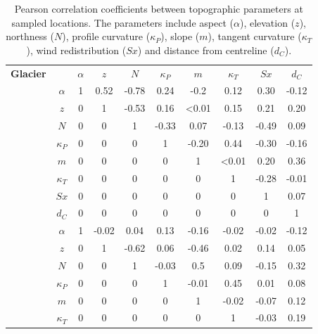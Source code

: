 \documentclass[12pt]{article}
\begin{document}
\begin{table}[]
\centering
\caption{Pearson correlation coefficients between topographic parameters at sampled locations. The parameters include aspect ($\alpha$), elevation ($z$), northness ($N$), profile curvature ($\kappa_P$), slope ($m$), tangent curvature ($\kappa_T$), wind redistribution ($Sx$) and distance from centreline ($d_C$).}
\label{tab:pearson_correlation}
\begin{tabular}{cccccccccc}
\textbf{Glacier} &  & \textbf{$\alpha$} & \textbf{$z$} & \textbf{$N$} & \textbf{$\kappa_P$} & \textbf{$m$} & \textbf{$\kappa_T$} & \textbf{$Sx$} & \textbf{$d_C$} \\
\rowcolor[HTML]{EFEFEF} 
\cellcolor[HTML]{EFEFEF} & \textbf{$\alpha$} & 1 & 0.52 & -0.78 & 0.24 & -0.2 & 0.12 & 0.30 & -0.12 \\
\rowcolor[HTML]{EFEFEF} 
\cellcolor[HTML]{EFEFEF} & \textbf{$z$} & 0 & 1 & -0.53 & 0.16 & \textless 0.01 & 0.15 & 0.21 & 0.20 \\
\rowcolor[HTML]{EFEFEF} 
\cellcolor[HTML]{EFEFEF} & \textbf{$N$} & 0 & 0 & 1 & -0.33 & 0.07 & -0.13 & -0.49 & 0.09 \\
\rowcolor[HTML]{EFEFEF} 
\cellcolor[HTML]{EFEFEF} & \textbf{$\kappa_P$} & 0 & 0 & 0 & 1 & -0.20 & 0.44 & -0.30 & -0.16 \\
\rowcolor[HTML]{EFEFEF} 
\cellcolor[HTML]{EFEFEF} & \textbf{$m$} & 0 & 0 & 0 & 0 & 1 & \textless 0.01 & 0.20 & 0.36 \\
\rowcolor[HTML]{EFEFEF} 
\cellcolor[HTML]{EFEFEF} & \textbf{$\kappa_T$} & 0 & 0 & 0 & 0 & 0 & 1 & -0.28 & -0.01 \\
\rowcolor[HTML]{EFEFEF} 
\cellcolor[HTML]{EFEFEF} & \textbf{$Sx$} & 0 & 0 & 0 & 0 & 0 & 0 & 1 & 0.07 \\
\rowcolor[HTML]{EFEFEF} 
\multirow{-8}{*}{\cellcolor[HTML]{EFEFEF}Glacier 4} & \textbf{$d_C$} & 0 & 0 & 0 & 0 & 0 & 0 & 0 & 1 \\
 & \textbf{$\alpha$} & 1 & -0.02 & 0.04 & 0.13 & -0.16 & -0.02 & -0.02 & -0.12 \\
 & \textbf{$z$} & 0 & 1 & -0.62 & 0.06 & -0.46 & 0.02 & 0.14 & 0.05 \\
 & \textbf{$N$} & 0 & 0 & 1 & -0.03 & 0.5 & 0.09 & -0.15 & 0.32 \\
 & $\kappa_P$ & 0 & 0 & 0 & 1 & -0.01 & 0.45 & 0.01 & 0.08 \\
 & $m$ & 0 & 0 & 0 & 0 & 1 & -0.02 & -0.07 & 0.12 \\
 & $\kappa_T$ & 0 & 0 & 0 & 0 & 0 & 1 & -0.03 & 0.19 \\

\end{tabular}
\end{table}
\end{document}
